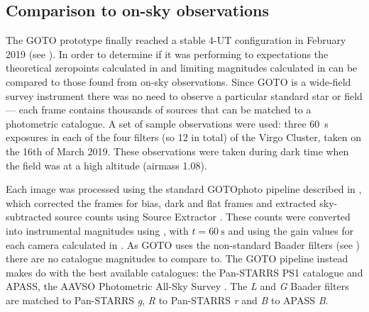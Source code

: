 \begin{colsection}
\newpage

\end{colsection}


\subsection{Comparison to on-sky observations}
\label{sec:onsky_comparison}
\begin{colsection}

The GOTO prototype finally reached a stable 4-UT configuration in February 2019 (see ). In order to determine if it was performing to expectations the theoretical zeropoints calculated in  and limiting magnitudes calculated in  can be compared to those found from on-sky observations. Since GOTO is a wide-field survey instrument there was no need to observe a particular standard star or field --- each frame contains thousands of sources that can be matched to a photometric catalogue. A set of sample observations were used: three \SI{60}{\second} exposures in each of the four filters (so 12 in total) of the Virgo Cluster, taken on the 16th of March 2019. These observations were taken during dark time when the field was at a high altitude (airmass 1.08).

Each image was processed using the standard GOTOphoto pipeline described in , which corrected the frames for bias, dark and flat frames and extracted sky-subtracted source counts using Source Extractor \citep{SE}. These counts were converted into instrumental magnitudes using , with $t=\SI{60}{\second}$ and using the gain values for each camera calculated in . As GOTO uses the non-standard Baader filters (see ) there are no catalogue magnitudes to compare to. The GOTO pipeline instead makes do with the best available catalogues: the Pan-STARRS PS1 catalogue \citep{Pan-STARRS} and APASS, the AAVSO Photometric All-Sky Survey \citep{APASS}. The \textit{L} and \textit{G} Baader filters are matched to Pan-STARRS \textit{g}, \textit{R} to Pan-STARRS \textit{r} and \textit{B} to APASS \textit{B}.

\newpage


\end{colsection}
